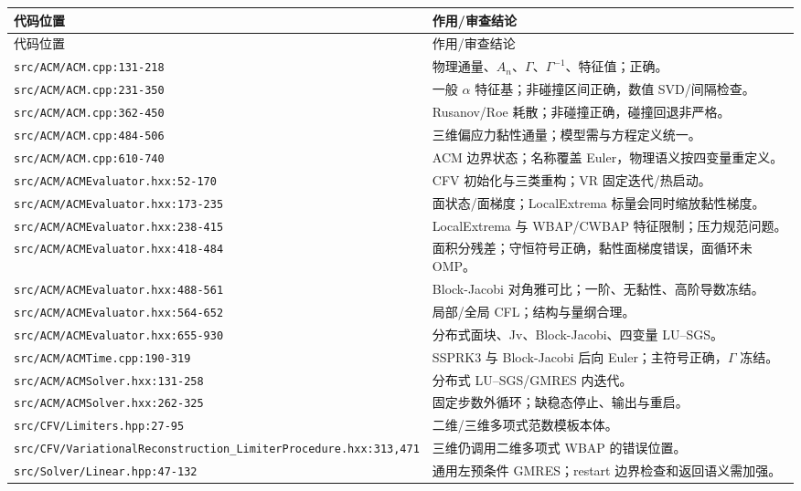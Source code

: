 \documentclass[UTF8,11pt,a4paper]{ctexart}
\newcommand{\code}[1]{\nolinkurl{#1}}
\begin{document}
\begin{longtable}{p{}p{}}
\toprule
代码位置 & 作用/审查结论\\
\midrule
\endfirsthead
\toprule
代码位置 & 作用/审查结论\\
\midrule
\endhead
\code{src/ACM/ACM.cpp:131-218} & 物理通量、$A_n$、$\Gamma$、$\Gamma^{-1}$、特征值；正确。\\
\code{src/ACM/ACM.cpp:231-350} & 一般 $\alpha$ 特征基；非碰撞区间正确，数值 SVD/间隔检查。\\
\code{src/ACM/ACM.cpp:362-450} & Rusanov/Roe 耗散；非碰撞正确，碰撞回退非严格。\\
\code{src/ACM/ACM.cpp:484-506} & 三维偏应力黏性通量；模型需与方程定义统一。\\
\code{src/ACM/ACM.cpp:610-740} & ACM 边界状态；名称覆盖 Euler，物理语义按四变量重定义。\\
\code{src/ACM/ACMEvaluator.hxx:52-170} & CFV 初始化与三类重构；VR 固定迭代/热启动。\\
\code{src/ACM/ACMEvaluator.hxx:173-235} & 面状态/面梯度；LocalExtrema 标量会同时缩放黏性梯度。\\
\code{src/ACM/ACMEvaluator.hxx:238-415} & LocalExtrema 与 WBAP/CWBAP 特征限制；压力规范问题。\\
\code{src/ACM/ACMEvaluator.hxx:418-484} & 面积分残差；守恒符号正确，黏性面梯度错误，面循环未 OMP。\\
\code{src/ACM/ACMEvaluator.hxx:488-561} & Block-Jacobi 对角雅可比；一阶、无黏性、高阶导数冻结。\\
\code{src/ACM/ACMEvaluator.hxx:564-652} & 局部/全局 CFL；结构与量纲合理。\\
\code{src/ACM/ACMEvaluator.hxx:655-930} & 分布式面块、Jv、Block-Jacobi、四变量 LU--SGS。\\
\code{src/ACM/ACMTime.cpp:190-319} & SSPRK3 与 Block-Jacobi 后向 Euler；主符号正确，$\Gamma$ 冻结。\\
\code{src/ACM/ACMSolver.hxx:131-258} & 分布式 LU--SGS/GMRES 内迭代。\\
\code{src/ACM/ACMSolver.hxx:262-325} & 固定步数外循环；缺稳态停止、输出与重启。\\
\code{src/CFV/Limiters.hpp:27-95} & 二维/三维多项式范数模板本体。\\
\code{src/CFV/VariationalReconstruction_LimiterProcedure.hxx:313,471} & 三维仍调用二维多项式 WBAP 的错误位置。\\
\code{src/Solver/Linear.hpp:47-132} & 通用左预条件 GMRES；restart 边界检查和返回语义需加强。\\
\bottomrule
\end{longtable}
\end{document}
